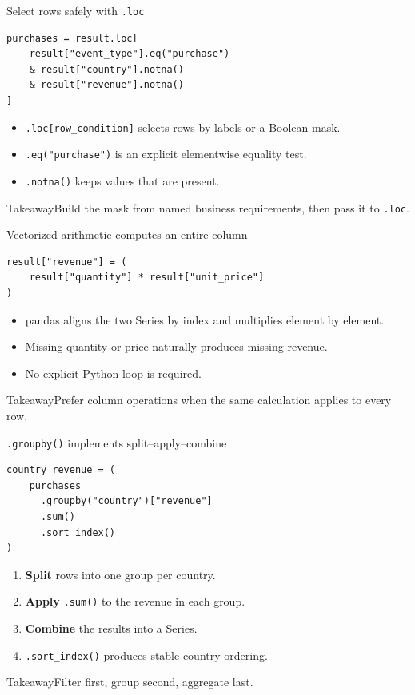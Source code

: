 \documentclass[11pt,aspectratio=43]{beamer}
\newcommand{\code}[1]{\texttt{#1}}
\newcommand{\takeaway}[1]{%
  \par\vspace{0.4em}
  \begin{block}{Takeaway}#1\end{block}}
\begin{document}
\begin{frame}[fragile]{Select rows safely with \texttt{.loc}}
\begin{lstlisting}
purchases = result.loc[
    result["event_type"].eq("purchase")
    & result["country"].notna()
    & result["revenue"].notna()
]
\end{lstlisting}
\begin{itemize}
  \item \code{.loc[row\_condition]} selects rows by labels or a Boolean mask.
  \item \code{.eq("purchase")} is an explicit elementwise equality test.
  \item \code{.notna()} keeps values that are present.
\end{itemize}
\takeaway{Build the mask from named business requirements, then pass it to \texttt{.loc}.}
\end{frame}

\begin{frame}[fragile]{Vectorized arithmetic computes an entire column}
\begin{lstlisting}
result["revenue"] = (
    result["quantity"] * result["unit_price"]
)
\end{lstlisting}
\begin{itemize}
  \item pandas aligns the two Series by index and multiplies element by element.
  \item Missing quantity or price naturally produces missing revenue.
  \item No explicit Python loop is required.
\end{itemize}
\takeaway{Prefer column operations when the same calculation applies to every row.}
\end{frame}

\begin{frame}[fragile]{\texttt{.groupby()} implements split--apply--combine}
\begin{lstlisting}
country_revenue = (
    purchases
      .groupby("country")["revenue"]
      .sum()
      .sort_index()
)
\end{lstlisting}
\begin{enumerate}
  \item \textbf{Split} rows into one group per country.
  \item \textbf{Apply} \code{.sum()} to the revenue in each group.
  \item \textbf{Combine} the results into a Series.
  \item \code{.sort\_index()} produces stable country ordering.
\end{enumerate}
\takeaway{Filter first, group second, aggregate last.}
\end{frame}
\end{document}
